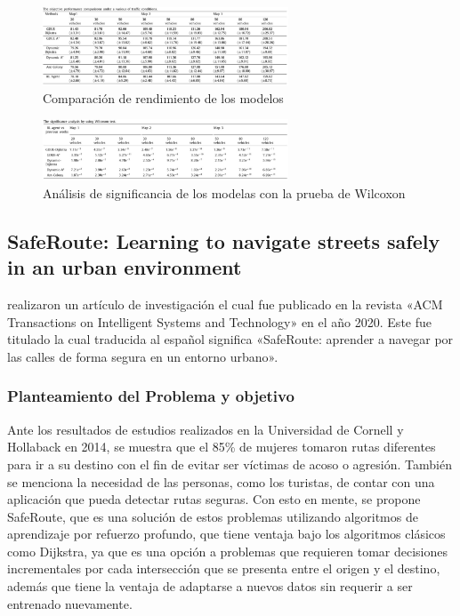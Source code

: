 \begin{figure}[h]
	\begin{center}
		\includegraphics[width=0.65\textwidth]{2/figures/ResultSumo.jpg}
		\caption{Comparación de rendimiento de los modelos}
		\label{1:fig2}
	\end{center}
\end{figure}


 \begin{figure}[h]
	\begin{center}
		\includegraphics[width=0.65\textwidth]{2/figures/Result2Sumo.jpg}
		\caption{Análisis de significancia de los modelas con la prueba de Wilcoxon}
		\label{1:fig2}
	\end{center}
\end{figure}

\subsection{SafeRoute: Learning to navigate streets safely in an urban environment \citep*{pr_saferoute}}
\citeauthor{pr_saferoute} realizaron un artículo de investigación el cual fue publicado en la revista «ACM Transactions on Intelligent Systems and Technology» en el año 2020. Este fue titulado  la cual traducida al español significa «SafeRoute: aprender a navegar por las calles de forma segura en un entorno urbano».

\subsubsection{Planteamiento del Problema y objetivo }
Ante los resultados de estudios realizados en la Universidad de Cornell y Hollaback en 2014, se muestra que el 85\% de mujeres tomaron rutas diferentes para ir a su destino con el fin de evitar ser víctimas de acoso o agresión. También se menciona la necesidad de las personas, como los turistas, de contar con una aplicación que pueda detectar rutas seguras. Con esto en mente, se propone SafeRoute, que es una solución de estos problemas utilizando algoritmos de aprendizaje por refuerzo profundo, que tiene ventaja bajo los algoritmos clásicos como Dijkstra, ya que es una opción a problemas que requieren tomar decisiones incrementales por cada intersección que se presenta entre el origen y el destino, además que tiene la ventaja de adaptarse a nuevos datos sin requerir a ser entrenado nuevamente.


